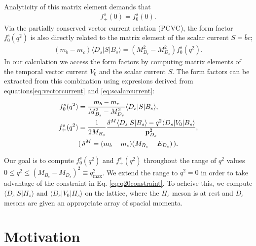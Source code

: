 Analyticity of this matrix element demands that
\begin{align}
  f_+^s(0) = f_0^s(0).
  \label{eq:q20constraint}
\end{align}
Via the partially conserved vector current relation (PCVC), the form factor $f_0^s(q^2)$ is also directly related to the matrix element of the scalar current $S=\bar{b}c$;
\begin{align}
  (m_b-m_c)\langle D_s | S | B_s \rangle = (M^2_{B_s} - M^2_{D_s}) f_0^s(q^2).
    \label{eq:scalarcurrent}
\end{align}
In our calculation we access the form factors by computing matrix elements of the temporal vector current $V_0$ and the scalar current $S$. The form factors can be extracted from this combination using expresions derived from equations\eqref{eq:vectorcurrent} and \eqref{eq:scalarcurrent}:
\begin{align}
  f_0^s(q^2) &= {m_b - m_c\over M_{B_s}^2 - M_{D_s}^2 } \langle D_s | S | B_s \rangle, \\
  f_+^s(q^2) &= {1\over 2M_{B_s}} { \delta^M \langle D_s | S | B_s \rangle - q^2 \langle D_s | V_0 | B_s \rangle \over {\bf{p}}^2_{D_s}}, \\
    &( \, \delta^M = (m_b - m_c)(M_{B_s}-E_{D_s}) \, ). \nonumber
\end{align}

Our goal is to compute $f_0^s(q^2)$ and $f_+^s(q^2)$ throughout the range of $q^2$ values $0 \leq q^2 \leq (M_{B_s}-M_{D_s})^2 \equiv q^2_{\text{max}}$. We extend the range to $q^2=0$ in order to take advantage of the constraint in Eq. \eqref{eq:q20constraint}. To acheive this, we compute $\langle D_s | S | H_s \rangle$ and $\langle D_s | V_0 | H_s \rangle$ on the lattice, where the $H_s$ meson is at rest and $D_s$ mesons are given an appropriate array of spacial momenta.


\section{Motivation}
\label{sec:BsDs_intro}


